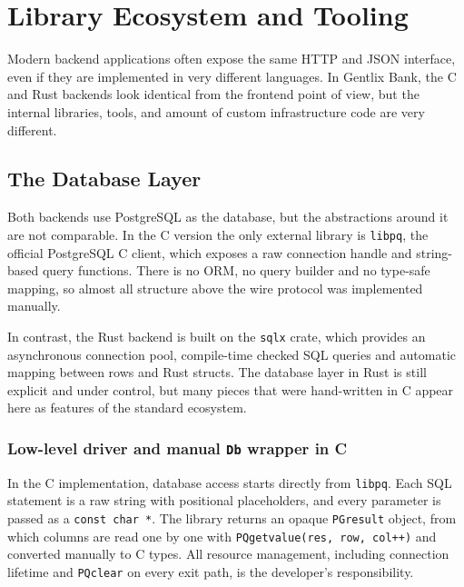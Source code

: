 \chapter{Library Ecosystem and Tooling}
\label{chap:ch6}

\par Modern backend applications often expose the same HTTP and JSON interface, even if they are implemented in very different languages. In Gentlix Bank, the C and Rust backends look identical from the frontend point of view, but the internal libraries, tools, and amount of custom infrastructure code are very different.

\section{The Database Layer}
\label{sec:ch6sec1}

\par Both backends use PostgreSQL as the database, but the abstractions around it are not comparable. In the C version the only external library is \texttt{libpq}, the official PostgreSQL C client, which exposes a raw connection handle and string-based query functions. There is no ORM, no query builder and no type-safe mapping, so almost all structure above the wire protocol was implemented manually.

\par In contrast, the Rust backend is built on the \texttt{sqlx} crate, which provides an asynchronous connection pool, compile-time checked SQL queries and automatic mapping between rows and Rust structs. The database layer in Rust is still explicit and under control, but many pieces that were hand-written in C appear here as features of the standard ecosystem.

\subsection{Low-level driver and manual \texorpdfstring{\texttt{Db}}{Db} wrapper in C}
\label{subsec:ch6sec1-1}

\par In the C implementation, database access starts directly from \texttt{libpq}. Each SQL statement is a raw string with positional placeholders, and every parameter is passed as a \texttt{const char *}. The library returns an opaque \texttt{PGresult} object, from which columns are read one by one with \texttt{PQgetvalue(res, row, col++)} and converted manually to C types. All resource management, including connection lifetime and \texttt{PQclear} on every exit path, is the developer's responsibility.

